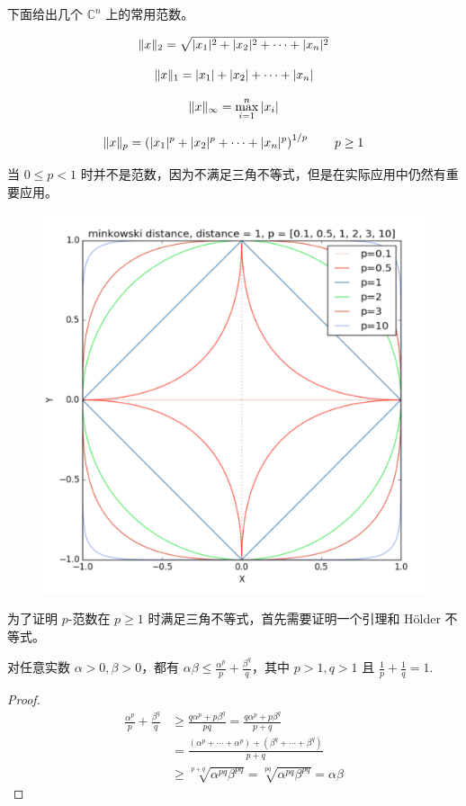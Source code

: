 下面给出几个 $\mathbb C^n$ 上的常用范数。

\begin{example}[2-范数]
\[
    \Vert x\Vert_2=\sqrt{|x_1|^2+|x_2|^2+\cdots+|x_n|^2}
\]
\end{example}

\begin{example}[1-范数]
\[
    \Vert x\Vert_1=|x_1|+|x_2|+\cdots+|x_n|
\]
\end{example}

\begin{example}[$\infty$-范数]
\[
    \Vert x\Vert_\infty=\max_{i=1}^n |x_i|
\]
\end{example}

\begin{example}[$p$-范数]
\[
    \Vert x\Vert_p=\left(|x_1|^p+|x_2|^p+\cdots+|x_n|^p\right)^{1/p}\quad\quad p\geq 1
\]
\end{example}

\begin{remark}
当 $0\leq p<1$ 时并不是范数，因为不满足三角不等式，但是在实际应用中仍然有重要应用。    
\end{remark}

\begin{figure}[H]
    \centering
    \includegraphics[width=0.5\linewidth]{figs/pnorm.png}
\end{figure}

为了证明 $p$-范数在 $p\geq 1$ 时满足三角不等式，首先需要证明一个引理和 Hölder 不等式。

\begin{lemma}
对任意实数 $\alpha>0,\beta>0$，都有 $\alpha\beta\leq \frac{\alpha^p}{p}+\frac{\beta^q}{q}$，其中 $p>1,q>1$ 且 $\frac{1}{p}+\frac{1}{q}=1$.
\end{lemma}
\begin{proof}
\begin{align*}
    \frac{\alpha^p}{p}+\frac{\beta^q}{q}&\geq\frac{q\alpha^p+p\beta^q}{pq}=\frac{q\alpha^p+p\beta^q}{p+q}\\
    &=\frac{(\alpha^p+\cdots+\alpha^p)+(\beta^q+\cdots+\beta^q)}{p+q}\\
    &\geq\sqrt[p+q]{\alpha^{pq}\beta^{pq}}=\sqrt[pq]{\alpha^{pq}\beta^{pq}}=\alpha\beta
\end{align*}
\end{proof}

